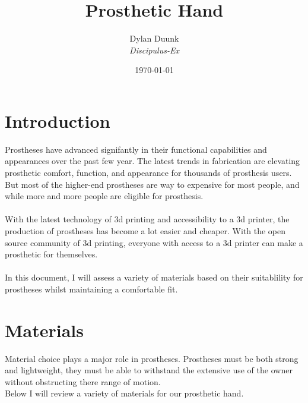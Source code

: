 \documentclass[11pt, a4paper]{article}
\title{\Huge{Prosthetic Hand} }
\author{Dylan Duunk \\ \textit{Discipulus-Ex} }
\date{\today}
\begin{document}
\begin{titlepage}
    \maketitle
\end{titlepage}




\newpage
\tableofcontents
\newpage
{}

\section{Introduction}
Prostheses have advanced signifantly in their functional capabilities and appearances over the past few year.
The latest trends in fabrication are elevating prosthetic comfort, function, and appearance for thousands of prosthesis users.
But most of the higher-end prostheses are way to expensive for most people, and while more and more people are eligible for prosthesis.
\\ \\
With the latest technology of 3d printing and accessibility to a 3d printer, the production of prostheses has become a lot easier and cheaper.
With the open source community of 3d printing, everyone with access to a 3d printer can make a prosthetic for themselves.
\\ \\
In this document, I will assess a variety of materials based on their suitablility for prostheses whilst maintaining a comfortable fit. 

\section{Materials} \label{materials}
Material choice plays a major role in prostheses.
Prostheses must be both strong and lightweight, they must be able to withstand the extensive use of the owner without obstructing there range of motion.
\\
Below I will review a variety of materials for our prosthetic hand.
\end{document}
